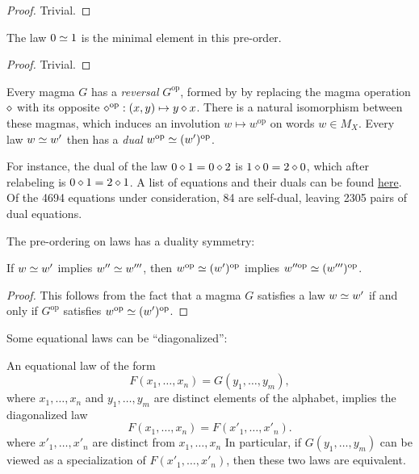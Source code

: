 \begin{proof} Trivial.
\end{proof}

\begin{lemma}\label{minimal}\leanok  The law $0  \simeq  1$ is the minimal element in this pre-order.
\end{lemma}

\begin{proof} Trivial.
\end{proof}

Every magma $G$ has a \emph{reversal} $G^{\mathrm{op}}$, formed by by replacing the magma operation $\diamond$ with its opposite $\diamond^{\mathrm{op}}:(x,y) \mapsto y \diamond x$. There is a natural isomorphism between these magmas, which induces an involution $w \mapsto w^{\mathrm{op}}$ on words $w \in M_X$.  Every law $w  \simeq  w'$ then has a \emph{dual} $w^{\mathrm{op}}  \simeq  (w')^{\mathrm{op}}$.

For instance, the dual of the law $0 \diamond 1 = 0 \diamond 2$ is $1 \diamond 0 = 2 \diamond 0$, which after relabeling is $0 \diamond 1 = 2 \diamond 1$.  A list of equations and their duals can be found \href{https://github.com/teorth/equational_theories/blob/main/data/dual_equations.md}{here}.  Of the 4694 equations under consideration, 84 are self-dual, leaving 2305 pairs of dual equations.

The pre-ordering on laws has a duality symmetry:

\begin{lemma}\leanok\label{duality}  If $w  \simeq  w'$ implies $w''  \simeq  w'''$, then $w^{\mathrm{op}}  \simeq  (w')^{\mathrm{op}}$ implies $w''^{\mathrm{op}}  \simeq  (w''')^{\mathrm{op}}$.
\end{lemma}

\begin{proof} This follows from the fact that a magma $G$ satisfies a law $w  \simeq  w'$ if and only if $G^{\mathrm{op}}$ satisfies $w^{\mathrm{op}}  \simeq  (w')^{\mathrm{op}}$.
\end{proof}

Some equational laws can be ``diagonalized'':

\begin{theorem}[Diagonalization]\label{diag}  An equational law of the form
  \begin{equation}\label{prediag} F(x_1,\dots,x_n) = G(y_1,\dots,y_m),
  \end{equation}
  where $x_1,\dots,x_n$ and $y_1,\dots,y_m$ are distinct elements of the alphabet, implies the diagonalized law
$$ F(x_1,\dots,x_n) = F(x'_1,\dots,x'_n).$$
where $x'_1,\dots,x'_n$ are distinct from $x_1,\dots,x_n$
In particular, if $G(y_1,\dots,y_m)$ can be viewed as a specialization of $F(x'_1,\dots,x'_n)$, then these two laws are equivalent.
\end{theorem}

